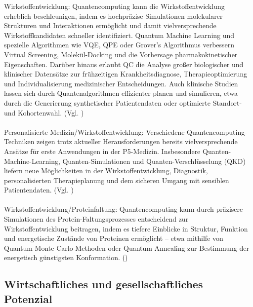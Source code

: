 Wirkstoffentwicklung:
Quantencomputing kann die Wirkstoffentwicklung erheblich beschleunigen, indem es hochpräzise Simulationen molekularer Strukturen und Interaktionen ermöglicht und damit vielversprechende Wirkstoffkandidaten schneller identifiziert. Quantum Machine Learning und spezielle Algorithmen wie VQE, QPE oder Grover’s Algorithmus verbessern Virtual Screening, Molekül-Docking und die Vorhersage pharmakokinetischer Eigenschaften. Darüber hinaus erlaubt QC die Analyse großer biologischer und klinischer Datensätze zur frühzeitigen Krankheitsdiagnose, Therapieoptimierung und Individualisierung medizinischer Entscheidungen. Auch klinische Studien lassen sich durch Quantenalgorithmen effizienter planen und simulieren, etwa durch die Generierung synthetischer Patientendaten oder optimierte Standort- und Kohortenwahl. (Vgl. \cite{bertl_quantum_2025})\\
\\
Personalisierte Medizin/Wirkstoffentwicklung:
Verschiedene Quantencomputing-Techniken zeigen trotz aktueller Herausforderungen bereits vielversprechende Ansätze für erste Anwendungen in der P5-Medizin. Insbesondere Quanten-Machine-Learning, Quanten-Simulationen und Quanten-Verschlüsselung (QKD) liefern neue Möglichkeiten in der Wirkstoffentwicklung, Diagnostik, personalisierten Therapieplanung und dem sicheren Umgang mit sensiblen Patientendaten. (Vgl. \cite{bertl_quantum_2025})\\
\\
Wirkstoffentwicklung/Proteinfaltung:
Quantencomputing kann durch präzisere Simulationen des Protein-Faltungsprozesses entscheidend zur Wirkstoffentwicklung beitragen, indem es tiefere Einblicke in Struktur, Funktion und energetische Zustände von Proteinen ermöglicht – etwa mithilfe von Quantum Monte Carlo-Methoden oder Quantum Annealing zur Bestimmung der energetisch günstigsten Konformation. (\cite{bertl_quantum_2025})

\subsection{Wirtschaftliches und gesellschaftliches Potenzial}


